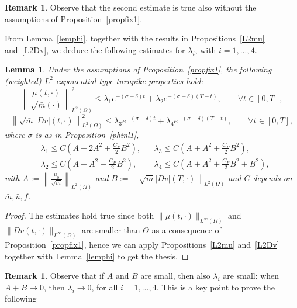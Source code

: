 \documentclass[10pt,a4paper,nouppercase,nowrite]{article}
\numberwithin{equation}{section}
\newtheorem{lem}[defn]{Lemma}
\theoremstyle{definition}
\newtheorem{rmk}[defn]{Remark}
\begin{document}
	\begin{rmk}
		Observe that the second estimate is true also without the assumptions of Proposition~\ref{propfix1}.
	\end{rmk}
	From Lemma~\ref{lemphi}, together with the results in Propositions~\ref{L2mu} and~\ref{L2Dv}, we deduce the following estimates for $\lambda_i$, with $i=1,...,4$.
	\begin{lem}	\label{lambdasmall}
		Under the assumptions of Proposition~\ref{propfix1}, the following (weighted) $L^2$ exponential-type turnpike properties hold:
		\begin{equation*}
			\left \| \frac{\mu(t,\cdot)}{\sqrt{\bar{m}(\cdot)}}\right \|^2_{L^2(\Omega)} \le \lambda_1 e^{-(\sigma-\delta) t} + \lambda_2 e^{-(\sigma+\delta) (T-t)}, \qquad \forall t \in [0,T],
		\end{equation*}
		\begin{equation*}
			\left \| \sqrt{\bar{m}} |Dv|(t,\cdot) \right \|^2_{L^2(\Omega)} \le \lambda_3 e^{-(\sigma-\delta) t} + \lambda_4 e^{-(\sigma+\delta) (T-t)}, \qquad \forall t \in [0,T],
		\end{equation*}
		where $\sigma$ is as in Proposition~\ref{phinl1},
		\begin{align*}
			&\lambda_1 \le C \left( A + 2 A^2 + \frac{C_P}{2} B^2 \right),  &  &\lambda_3 \le C \left( A + A^2 + \frac{C_P}{2} B^2 \right),         \\
			&\lambda_2 \le C \left( A + A^2 + \frac{C_P}{2} B^2 \right), &  &\lambda_4 \le C \left( A + A^2 + \frac{C_P}{2} B^2 + B^2 \right),
		\end{align*}
		with $A:= \left\| \frac{\mu_0}{\sqrt{\bar{m}}} \right\|_{L^2(\Omega)}$ and $B:=\left\| \sqrt{\bar{m}}|Dv|(T,\cdot) \right\|_{L^2(\Omega)}$ and $C$ depends on $\bar{m},\bar{u},f$.
	\end{lem}
	\begin{proof}
		The estimates hold true since both $\|\mu(t,\cdot)\|_{L^{\infty}(\Omega)}$ and $\|Dv(t,\cdot)\|_{L^{\infty}(\Omega)}$ are smaller than $\Theta$ as a consequence of Proposition~\ref{propfix1}, hence we can apply Propositions~\ref{L2mu} and~\ref{L2Dv} together with Lemma~\ref{lemphi} to get the thesis.
	\end{proof}
	\begin{rmk}
		Observe that if $A$ and $B$ are small, then also $\lambda_i$ are small: when $A+B \rightarrow 0$, then $\lambda_i \rightarrow 0$, for all $i=1,...,4$. This is a key point to prove the following
		\label{rmk2}
	\end{rmk}
\end{document}
